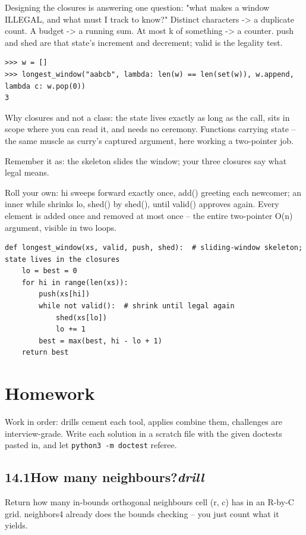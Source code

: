 \documentclass[10pt,letterpaper]{book}
\begin{document}
Designing the closures is answering one question: "what makes a window ILLEGAL, and what must I track to know?" Distinct characters -> a duplicate count. A budget -> a running sum. At most k of something -> a counter. push and shed are that state's increment and decrement; valid is the legality test.

\begin{lstlisting}[style=ex]
>>> w = []
>>> longest_window("aabcb", lambda: len(w) == len(set(w)), w.append, lambda c: w.pop(0))
3
\end{lstlisting}

Why closures and not a class: the state lives exactly as long as the call, sits in scope where you can read it, and needs no ceremony. Functions carrying state -- the same muscle as curry's captured argument, here working a two-pointer job.


Remember it as: the skeleton slides the window; your three closures say what legal means.


Roll your own: hi sweeps forward exactly once, add() greeting each newcomer; an inner while shrinks lo, shed() by shed(), until valid() approves again. Every element is added once and removed at most once -- the entire two-pointer O(n) argument, visible in two loops.

\begin{lstlisting}[style=ex]
def longest_window(xs, valid, push, shed):  # sliding-window skeleton; state lives in the closures
    lo = best = 0
    for hi in range(len(xs)):
        push(xs[hi])
        while not valid():  # shrink until legal again
            shed(xs[lo])
            lo += 1
        best = max(best, hi - lo + 1)
    return best
\end{lstlisting}

\section{Homework}
Work in order: drills cement each tool, applies combine them,
challenges are interview-grade. Write each solution in a scratch file with
the given doctests pasted in, and let \texttt{python3 -m doctest} referee.
\subsection*{14.1\quad How many neighbours?\hfill\textnormal{\textit{drill}}}
Return how many in-bounds orthogonal neighbours cell (r, c) has in an R-by-C grid. neighbors4 already does the bounds checking -- you just count what it yields.
\end{document}
